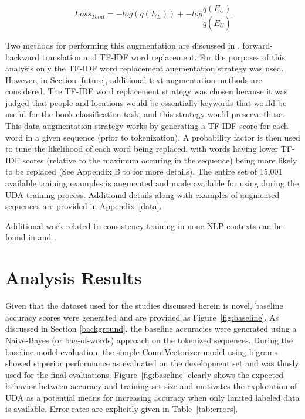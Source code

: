 \documentclass[twoside,twocolumn,10pt]{article}
\begin{document}
 \begin{equation}
 \label{eq:loss}
 Loss_{Total} = -log(q(E_{L})) + -log\frac{q(E_{U})}{q(E^{\prime}_{U})}
 \end{equation}

Two methods for performing this augmentation are discussed in \cite{Xie:2019}, forward-backward translation and TF-IDF word replacement. For the purposes of this analysis only the TF-IDF word replacement augmentation strategy was used. However, in Section \ref{future}, additional text augmentation methods are considered. The TF-IDF word replacement strategy was chosen because it was judged that people and locations would be essentially keywords that would be useful for the book classification task, and this strategy would preserve those. This data augmentation strategy works by generating a TF-IDF score for each word in a given sequence (prior to tokenization). A probability factor is then used to tune the likelihood of each word being replaced, with words having lower TF-IDF scores (relative to the maximum occuring in the sequence) being more likely to be replaced (See Appendix B to \cite{Xie:2019} for more details).  The entire set of  15,001 available training examples is augmented and made available for using during the UDA training process. Additional details along with examples of augmented sequences are provided in Appendix~\ref{data}.

Additional work related to consistency training in none NLP contexts can be found in \cite{Verma:2019} and \cite{Zhang:2019}.


\section{Analysis Results} \label{results}
Given that the dataset used for the studies discussed herein is novel, baseline accuracy scores were generated and are provided as Figure~\ref{fig:baseline}.   As discussed in Section \ref{background}, the baseline accuracies were generated using a Naive-Bayes (or bag-of-words) approach on the tokenized sequences.  During the baseline model evaluation, the simple CountVectorizer model using bigrams showed superior performance as evaluated on the development set and was thusly used for the final evaluations. Figure~\ref{fig:baseline} clearly shows the expected behavior between accuracy and training set size and motivates the exploration of UDA as a potential means for increasing accuracy when only limited labeled data is available.  Error rates are explicitly given in Table~\ref{tab:errors}. 
\end{document}
